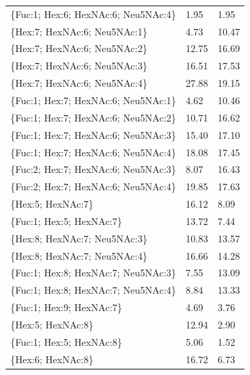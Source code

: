 \begin{table}
\begin{minipage}[t]{0.55\linewidth}
\begin{small}
\begin{tabular}{l|p{2cm} p{2cm}}
\{Fuc:1; Hex:6; HexNAc:6; Neu5NAc:4\} &                 1.95 &               1.95 \\
\{Hex:7; HexNAc:6; Neu5NAc:1\}        &                 4.73 &              10.47 \\
\{Hex:7; HexNAc:6; Neu5NAc:2\}        &                12.75 &              16.69 \\
\{Hex:7; HexNAc:6; Neu5NAc:3\}        &                16.51 &              17.53 \\
\{Hex:7; HexNAc:6; Neu5NAc:4\}        &                27.88 &              19.15 \\
\{Fuc:1; Hex:7; HexNAc:6; Neu5NAc:1\} &                 4.62 &              10.46 \\
\{Fuc:1; Hex:7; HexNAc:6; Neu5NAc:2\} &                10.71 &              16.62 \\
\{Fuc:1; Hex:7; HexNAc:6; Neu5NAc:3\} &                15.40 &              17.10 \\
\{Fuc:1; Hex:7; HexNAc:6; Neu5NAc:4\} &                18.08 &              17.45 \\
\{Fuc:2; Hex:7; HexNAc:6; Neu5NAc:3\} &                 8.07 &              16.43 \\
\{Fuc:2; Hex:7; HexNAc:6; Neu5NAc:4\} &                19.85 &              17.63 \\
\{Hex:5; HexNAc:7\}                   &                16.12 &               8.09 \\
\{Fuc:1; Hex:5; HexNAc:7\}            &                13.72 &               7.44 \\
\{Hex:8; HexNAc:7; Neu5NAc:3\}        &                10.83 &              13.57 \\
\{Hex:8; HexNAc:7; Neu5NAc:4\}        &                16.66 &              14.28 \\
\{Fuc:1; Hex:8; HexNAc:7; Neu5NAc:3\} &                 7.55 &              13.09 \\
\{Fuc:1; Hex:8; HexNAc:7; Neu5NAc:4\} &                 8.84 &              13.33 \\
\{Fuc:1; Hex:9; HexNAc:7\}            &                 4.69 &               3.76 \\
\{Hex:5; HexNAc:8\}                   &                12.94 &               2.90 \\
\{Fuc:1; Hex:5; HexNAc:8\}            &                 5.06 &               1.52 \\
\{Hex:6; HexNAc:8\}                   &                16.72 &               6.73 \\

\end{tabular}
\end{small}
\end{minipage}
\end{table}
